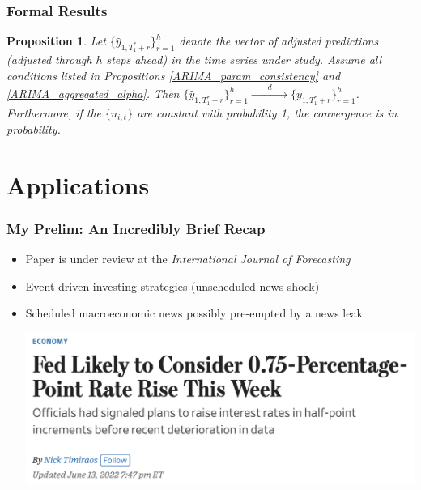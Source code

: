 \documentclass[9pt]{beamer}
\newtheorem{prop}{Proposition}
\theoremstyle{definition}
\begin{document}
\begin{frame}\frametitle{Formal Results}
        
        \begin{prop}\label{ARIMA_conv_distribution}
          Let $\{\hat y_{1,T_{1}^{*}+r}\}^{h}_{r=1}$ denote the vector of adjusted predictions (adjusted through $h$ steps ahead) in the time series under study.  Assume all conditions listed in Propositions \ref{ARIMA_param_consistency} and \ref{ARIMA_aggregated_alpha}.  Then $\{\hat y_{1,T_{1}^{*}+r}\}^{h}_{r=1} \xrightarrow{\qquad d\qquad} \{ y_{1,T_{1}^{*}+r}\}^{h}_{r=1}$.  Furthermore, if the $\{u_{i,t}\}$ are constant with probability 1, the convergence is in probability. 
          \end{prop}
\end{frame}

\section{Applications}

\begin{frame}
    \frametitle{My Prelim: An Incredibly Brief Recap}

    \begin{itemize}
        \item <1-> Paper is under review at the \textit{International Journal of Forecasting}
        \item <2-> Event-driven investing strategies (unscheduled news shock)
        \item <3-> Scheduled macroeconomic news possibly pre-empted by a news leak

        \href{https://www.wsj.com/articles/bad-inflation-reports-raise-odds-of-surprise-0-75-percentage-point-rate-rise-this-week-11655147927}{\includegraphics[scale=.3]{WSJ_rate_hike_2022.png}}
    \end{itemize}
\end{frame}
\end{document}
